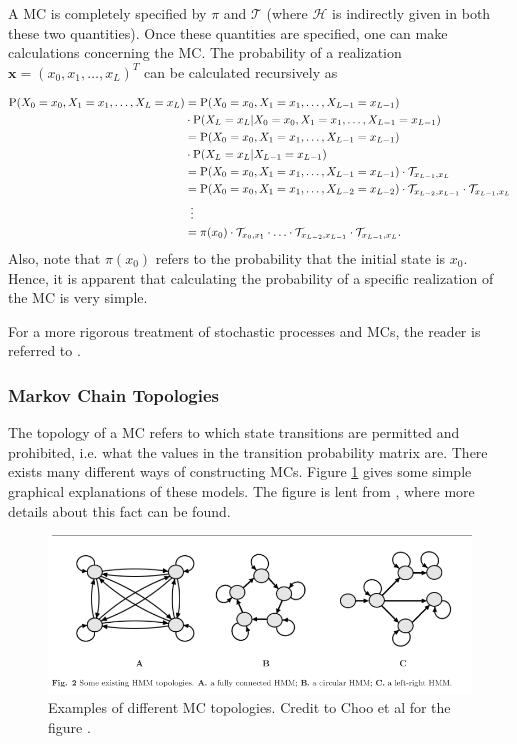 \documentclass{article}\usepackage[]{graphicx}\usepackage[]{color}
\begin{document}
A MC is completely specified by $\pi$ and $\mathcal{T}$ (where $\mathcal{H}$ is indirectly given in both these two quantities). Once these quantities are specified, one can make calculations concerning the MC. The probability of a realization $\mathbf{x} = (x_0, x_1, \ldots, x_L)^T$ can be calculated recursively as 

\begin{align*}
    \text{P}(X_0 = x_0, X_1 = x_1, \ldots, X_L = x_L) &= \text{P}(X_0 = x_0, X_1 = x_1, \ldots, X_{L-1} = x_{L-1})\\ 
    &\cdot\text{P}(X_L = x_L|X_0 = x_0, X_1 = x_1, \ldots, X_{L-1} = x_{L-1}) \\ 
    &= \text{P}(X_0 = x_0, X_1 = x_1, \ldots, X_{L-1} = x_{L-1})\\&\cdot\text{P}(X_L = x_L|X_{L-1} = x_{L-1}) \\ 
    &= \text{P}(X_0 = x_0, X_1 = x_1, \ldots, X_{L-1} = x_{L-1})\cdot\mathcal{T}_{x_{L-1}, x_L} \\ 
    &= \text{P}(X_0 = x_0, X_1 = x_1, \ldots, X_{L-2} = x_{L-2})\cdot \mathcal{T}_{x_{L-2}, x_{L-1}}\cdot\mathcal{T}_{x_{L-1}, x_L} \\ & \hspace{0.5em}\vdots \\ &= \pi(x_0)\cdot\mathcal{T}_{x_0,x_1}\cdot \ldots \cdot \mathcal{T}_{x_{L-2}, x_{L-1}} \cdot\mathcal{T}_{x_{L-1}, x_L}.
\end{align*}
Also, note that $\pi(x_0)$ refers to the probability that the initial state is $x_0$. Hence, it is apparent that calculating the probability of a specific realization of the MC is very simple. 

For a more rigorous treatment of stochastic processes and MCs, the reader is referred to \cite{Pinsky2011}.

\subsubsection{Markov Chain Topologies}
The topology of a MC refers to which state transitions are permitted and prohibited, i.e. what the values in the transition probability matrix are. There exists many different ways of constructing MCs. Figure \ref{fig:ChooTopologies} gives some simple graphical explanations of these models. The figure is lent from \cite{Choo2004}, where more details about this fact can be found. 

\begin{figure}
    \centering
    \includegraphics[width = \textwidth]{ChooHMMTopologies.png}
    \caption{Examples of different MC topologies. Credit to Choo et al for the figure \cite{Choo2004}.}
    \label{fig:ChooTopologies}
\end{figure}
\end{document}
